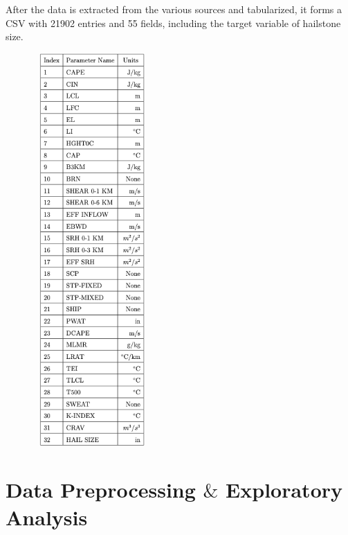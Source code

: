 \documentclass[fleqn,10pt]{SelfArx} %
\begin{document}
After the data is extracted from the various sources and tabularized, it forms a CSV with 21902 entries and 55 fields, including the target variable of hailstone size.
\begin{figure}[H]
\centering
\includegraphics[width = 4.5cm, height = 15cm]{"table3.png"}
\end{figure}

\bigskip
\bigskip


\section{Data Preprocessing $\&$ Exploratory Analysis} %
\end{document}
